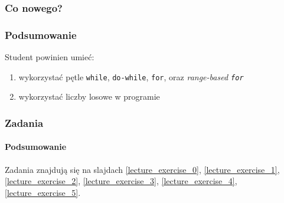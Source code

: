 \documentclass[aspectratio=169]{beamer}
\begin{document}
\begin{frame}
    \frametitle{Co nowego?}
    \frametitle{Podsumowanie}

    Student powinien umieć:

    \begin{enumerate}
        \item wykorzystać pętle {\tt while}, {\tt do-while}, {\tt for}, oraz
            \emph{range-based {\tt for}}
        \item wykorzystać liczby losowe w programie
    \end{enumerate}
\end{frame}

\begin{frame}
    \frametitle{Zadania}
    \framesubtitle{Podsumowanie}

    Zadania znajdują się na slajdach
    \ref{lecture_exercise_0},
    \ref{lecture_exercise_1},
    \ref{lecture_exercise_2},
    \ref{lecture_exercise_3},
    \ref{lecture_exercise_4},
    \ref{lecture_exercise_5}.
\end{frame}
\end{document}
